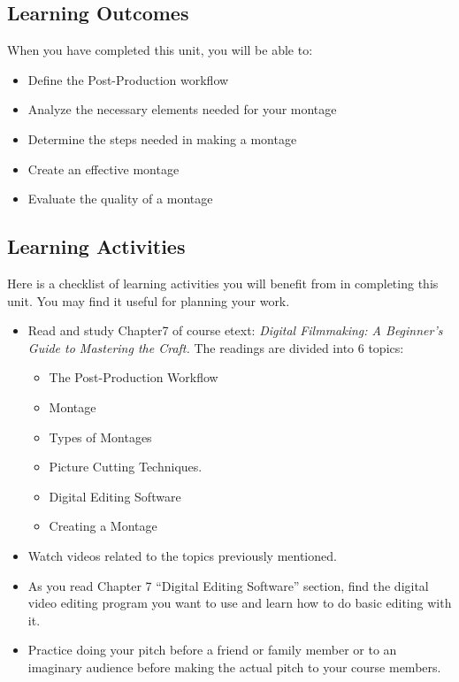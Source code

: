 \documentclass[
  letterpaper,
  DIV=11,
  numbers=noendperiod]{scrreprt}
\providecommand{\tightlist}{%
  \setlength{\itemsep}{0pt}\setlength{\parskip}{0pt}}\usepackage{longtable,booktabs,array}
\begin{document}
\subsection*{Learning Outcomes}\label{learning-outcomes-6}

When you have completed this unit, you will be able to:

\begin{itemize}
\tightlist
\item
  Define the Post-Production workflow
\item
  Analyze the necessary elements needed for your montage
\item
  Determine the steps needed in making a montage
\item
  Create an effective montage
\item
  Evaluate the quality of a montage
\end{itemize}

\subsection*{Learning Activities}\label{learning-activities-6}

Here is a checklist of learning activities you will benefit from in
completing this unit. You may find it useful for planning your work.

\begin{itemize}
\tightlist
\item
  Read and study Chapter7 of course etext: \emph{Digital Filmmaking: A
  Beginner's Guide to Mastering the Craft.} The readings are divided
  into 6 topics:

  \begin{itemize}
  \tightlist
  \item
    The Post-Production Workflow
  \item
    Montage
  \item
    Types of Montages
  \item
    Picture Cutting Techniques.
  \item
    Digital Editing Software
  \item
    Creating a Montage
  \end{itemize}
\item
  Watch videos related to the topics previously mentioned.
\item
  As you read Chapter 7 ``Digital Editing Software'' section, find the
  digital video editing program you want to use and learn how to do
  basic editing with it.
\item
  Practice doing your pitch before a friend or family member or to an
  imaginary audience before making the actual pitch to your course
  members.
\end{itemize}
\end{document}
